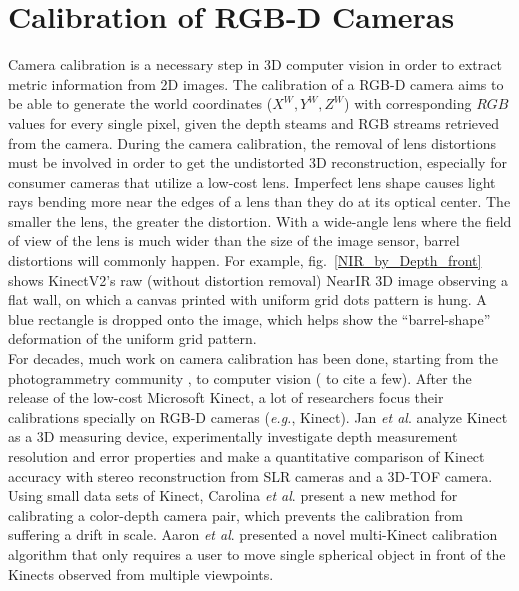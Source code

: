 \section{Calibration of RGB-D Cameras}
\indent
Camera calibration is a necessary step in 3D computer vision in order to extract metric information from 2D images. The calibration of a RGB-D camera aims to be able to generate the world coordinates (\(X^W, Y^W, Z^W\)) with corresponding \(RGB\) values for every single pixel, given the depth steams and RGB streams retrieved from the camera. During the camera calibration, the removal of lens distortions must be involved in order to get the undistorted 3D reconstruction, especially for consumer cameras that utilize a low-cost lens. Imperfect lens shape causes light rays bending more near the edges of a lens than they do at its optical center. The smaller the lens, the greater the distortion. With a wide-angle lens where the field of view of the lens is much wider than the size of the image sensor, barrel distortions will commonly happen. For example, fig.~\ref{NIR_by_Depth_front} shows KinectV2's raw (without distortion removal) NearIR 3D image observing a flat wall, on which a canvas printed with uniform grid dots pattern is hung. A blue rectangle is dropped onto the image, which helps show the \enquote{barrel-shape} deformation of the uniform grid pattern.
\\\indent
For decades, much work on camera calibration has been done, starting from the photogrammetry community \cite{photogrammetry01_1971} \cite{photogrammetry02_1975}, to computer vision (\cite{Tsai1987} \cite{treeDcalibration1_1993} \cite{Zhengyou04} to cite a few). After the release of the low-cost Microsoft Kinect, a lot of researchers focus their calibrations specially on RGB-D cameras (\textit{e.g.}, Kinect). Jan \textit{et al}. \cite{KinectCali01_2011} analyze Kinect as a 3D measuring device, experimentally investigate depth measurement resolution and error properties and make a quantitative comparison of Kinect accuracy with stereo reconstruction from SLR cameras and a 3D-TOF camera. Using small data sets of Kinect, Carolina \textit{et al}. \cite{KinectCali02_2013} present a new method for calibrating a color-depth camera pair, which prevents the calibration from suffering a drift in scale. Aaron \textit{et al}. \cite{KinectCali03_2015} presented a novel multi-Kinect calibration algorithm that only requires a user to move single spherical object in front of the Kinects observed from multiple viewpoints.
\\\indent
